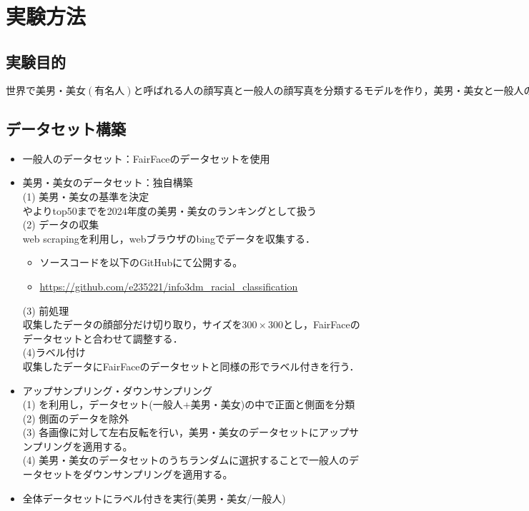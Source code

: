 \documentclass[a4paper,11pt,titlepage]{jsarticle}
\begin{document}
\section{実験方法}
\subsection{実験目的}
\(世界で美男・美女(有名人)と呼ばれる人の顔写真と一般人の顔写真を分類するモデルを作り，美男・美女と一般人の分類を行う．\)

\subsection{データセット構築}
\begin{itemize}
    \item 一般人のデータセット：FairFaceのデータセットを使用\\ 
    \item 美男・美女のデータセット：独自構築\\
            (1) 美男・美女の基準を決定\\
						\cite{bidanshi}や\cite{bijoshi}よりtop50までを2024年度の美男・美女のランキングとして扱う\\
            (2) データの収集\\
            web scrapingを利用し，webブラウザのbingでデータを収集する．\\
						\begin{itemize}
						\item ソースコードを以下のGitHubにて公開する。
            \item \url{https://github.com/e235221/info3dm\_racial\_classification}
            \end{itemize}
            (3) 前処理\\
            収集したデータの顔部分だけ切り取り，サイズを$300 \times 300$とし，FairFaceのデータセットと合わせて調整する．\\
            (4)ラベル付け\\
            収集したデータにFairFaceのデータセットと同様の形でラベル付きを行う．
    \item アップサンプリング・ダウンサンプリング\\
            (1) \cite{hopenet}を利用し，データセット(一般人+美男・美女)の中で正面と側面を分類\\
            (2) 側面のデータを除外\\
            (3) 各画像に対して左右反転を行い，美男・美女のデータセットにアップサンプリングを適用する。\\
            (4) 美男・美女のデータセットのうちランダムに選択することで一般人のデータセットをダウンサンプリングを適用する。
    \item 全体データセットにラベル付きを実行(美男・美女/一般人)

\end{itemize}
\end{document}
